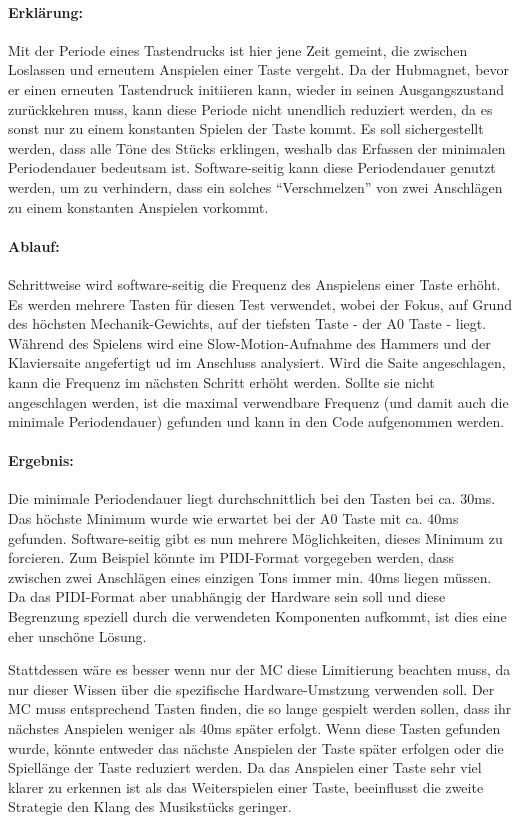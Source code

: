 \paragraph{Erklärung:}
Mit der Periode eines Tastendrucks ist hier jene Zeit gemeint, die zwischen Loslassen und erneutem Anspielen einer Taste vergeht.
Da der Hubmagnet, bevor er einen erneuten Tastendruck initiieren kann, wieder in seinen Ausgangszustand zurückkehren muss, kann diese Periode nicht unendlich reduziert werden, da es sonst nur zu einem konstanten Spielen der Taste kommt.
Es soll sichergestellt werden, dass alle Töne des Stücks erklingen, weshalb das Erfassen der minimalen Periodendauer bedeutsam ist.
Software-seitig kann diese Periodendauer genutzt werden, um zu verhindern, dass ein solches \enquote{Verschmelzen} von zwei Anschlägen zu einem konstanten Anspielen vorkommt.

\paragraph{Ablauf:}
Schrittweise wird software-seitig die Frequenz des Anspielens einer Taste erhöht.
Es werden mehrere Tasten für diesen Test verwendet, wobei der Fokus, auf Grund des höchsten Mechanik-Gewichts, auf der tiefsten Taste - der A0 Taste - liegt.
Während des Spielens wird eine Slow-Motion-Aufnahme des Hammers und der Klaviersaite angefertigt ud im Anschluss analysiert.
Wird die Saite angeschlagen, kann die Frequenz im nächsten Schritt erhöht werden.
Sollte sie nicht angeschlagen werden, ist die maximal verwendbare Frequenz (und damit auch die minimale Periodendauer) gefunden und kann in den Code aufgenommen werden.

\paragraph{Ergebnis:}
Die minimale Periodendauer liegt durchschnittlich bei den Tasten bei ca. 30ms.
Das höchste Minimum wurde wie erwartet bei der A0 Taste mit ca. 40ms gefunden. \newline
Software-seitig gibt es nun mehrere Möglichkeiten, dieses Minimum zu forcieren.
Zum Beispiel könnte im \ac{PIDI}-Format vorgegeben werden, dass zwischen zwei Anschlägen eines einzigen Tons immer min. 40ms liegen müssen.
Da das \ac{PIDI}-Format aber unabhängig der Hardware sein soll und diese Begrenzung speziell durch die verwendeten Komponenten aufkommt, ist dies eine eher unschöne Lösung.

Stattdessen wäre es besser wenn nur der \ac{MC} diese Limitierung beachten muss, da nur dieser Wissen über die spezifische Hardware-Umstzung verwenden soll.
Der \ac{MC} muss entsprechend Tasten finden, die so lange gespielt werden sollen, dass ihr nächstes Anspielen weniger als 40ms später erfolgt.
Wenn diese Tasten gefunden wurde, könnte entweder das nächste Anspielen der Taste später erfolgen oder die Spiellänge der Taste reduziert werden.
Da das Anspielen einer Taste sehr viel klarer zu erkennen ist als das Weiterspielen einer Taste, beeinflusst die zweite Strategie den Klang des Musikstücks geringer.

